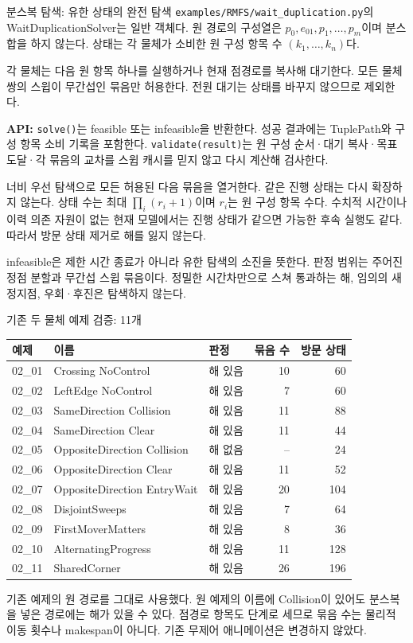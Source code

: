 \begin{frame}{분스복 탐색: 유한 상태의 완전 탐색}
\small
\texttt{examples/RMFS/wait\_duplication.py}의 WaitDuplicationSolver는 일반 객체다.
원 경로의 구성열은 $p_0,e_{01},p_1,\ldots,p_m$이며 분스합을 하지 않는다.
상태는 각 물체가 소비한 원 구성 항목 수 $(k_1,\ldots,k_n)$다.
\par\medskip
각 물체는 다음 원 항목 하나를 실행하거나 현재 점경로를 복사해 대기한다.
모든 물체 쌍의 스윕이 무간섭인 묶음만 허용한다.
전원 대기는 상태를 바꾸지 않으므로 제외한다.
\par\medskip
\textbf{API:} \texttt{solve()}는 feasible 또는 infeasible을 반환한다.
성공 결과에는 TuplePath와 구성 항목 소비 기록을 포함한다.
\texttt{validate(result)}는 원 구성 순서·대기 복사·목표 도달·각 묶음의 교차를
스윕 캐시를 믿지 않고 다시 계산해 검사한다.
\par\medskip
너비 우선 탐색으로 모든 허용된 다음 묶음을 열거한다.
같은 진행 상태는 다시 확장하지 않는다. 상태 수는 최대
$\prod_i(r_i+1)$이며 $r_i$는 원 구성 항목 수다.
수치적 시간이나 이력 의존 자원이 없는 현재 모델에서는 진행 상태가 같으면
가능한 후속 실행도 같다. 따라서 방문 상태 제거로 해를 잃지 않는다.
\par\medskip\footnotesize
infeasible은 제한 시간 종료가 아니라 유한 탐색의 소진을 뜻한다.
판정 범위는 주어진 정점 분할과 무간섭 스윕 묶음이다.
정밀한 시간차만으로 스쳐 통과하는 해, 임의의 새 정지점, 우회·후진은 탐색하지 않는다.
\end{frame}

\begin{frame}{기존 두 물체 예제 검증: 11개}
\small\renewcommand{\arraystretch}{1.12}
\begin{tabular}{p{1.1cm}p{5.8cm}p{2cm}rr}\toprule
예제 & 이름 & 판정 & 묶음 수 & 방문 상태\\\midrule
02\_01 & Crossing NoControl & 해 있음 & 10 & 60\\
02\_02 & LeftEdge NoControl & 해 있음 & 7 & 60\\
02\_03 & SameDirection Collision & 해 있음 & 11 & 88\\
02\_04 & SameDirection Clear & 해 있음 & 11 & 44\\
02\_05 & OppositeDirection Collision & 해 없음 & -- & 24\\
02\_06 & OppositeDirection Clear & 해 있음 & 11 & 52\\
02\_07 & OppositeDirection EntryWait & 해 있음 & 20 & 104\\
02\_08 & DisjointSweeps & 해 있음 & 7 & 64\\
02\_09 & FirstMoverMatters & 해 있음 & 8 & 36\\
02\_10 & AlternatingProgress & 해 있음 & 11 & 128\\
02\_11 & SharedCorner & 해 있음 & 26 & 196\\\bottomrule
\end{tabular}
\par\medskip\footnotesize
기존 예제의 원 경로를 그대로 사용했다. 원 예제의 이름에 Collision이 있어도
분스복을 넣은 경로에는 해가 있을 수 있다. 점경로 항목도 단계로 세므로 묶음 수는
물리적 이동 횟수나 makespan이 아니다. 기존 무제어 애니메이션은 변경하지 않았다.
\end{frame}

